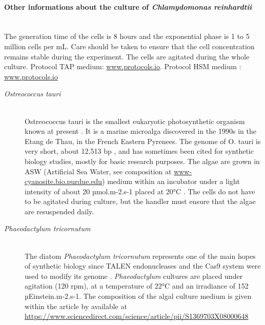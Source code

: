 \paragraph{Other informations about the culture of \textit{Chlamydomonas reinhardtii}} \mbox{}\\
The generation time of the cells is 8 hours and the exponential phase is 1 to 5 million cells per mL. Care should be taken to ensure that the cell concentration remains stable during the experiment. The cells are agitated during the whole culture.
Protocol TAP medium: \href{https://www.protocols.io/view/TRIS-acetate-phosphate-TAP-medium-e95bh86}{www.protocols.io}.
Protocol HSM medium : \href{https://www.protocols.io/view/Sueoka-s-High-Salt-Medium-fdebi3e}{www.protocols.io}

\begin{description}
\item[\textit{Ostreococcus tauri}]\mbox{}\\ 
Ostreococcus tauri is the smallest eukaryotic photosynthetic organism known at present \parencite{Chretiennot-Dinet1995}. It is a marine microalga discovered in the 1990s in the Etang de Thau, in the French Eastern Pyrenees. The genome of O. tauri is very short, about 12,513 bp \parencite{Derelle2006}, and has sometimes been cited for synthetic biology studies, mostly for basic research purposes. The algae are grown in ASW (Artificial Sea Water, see composition at \href{https://www-cyanosite.bio.purdue.edu/media/table/asw.html}{www-cyanosite.bio.purdue.edu}) medium within an incubator under a light intensity of about 20 µmol.m-2.s-1 placed at 20°C \parencite{vanOoijen2012}. The cells do not have to be agitated during culture, but the handler must ensure that the algae are resuspended daily.
 
\item[\textit{Phaeodactylum tricornutum}]\mbox{}\\
The diatom \textit{Phaeodactylum tricornutum} represents one of the main hopes of synthetic biology since TALEN endonucleases and the Cas9 system were used to modify its genome \parencite{Kroth2018}. \textit{Phaeodactylum} cultures are placed under agitation (120 rpm), at a temperature of 22°C and an irradiance of 152 µEinstein.m-2.s-1. The composition of the algal culture medium is given within the article by \parencite{Bitaub2008} available at \href{https://www.sciencedirect.com/science/article/pii/S1369703X08000648}{https://www.sciencedirect.com/science/article/pii/S1369703X08000648}
 

\end{description}
